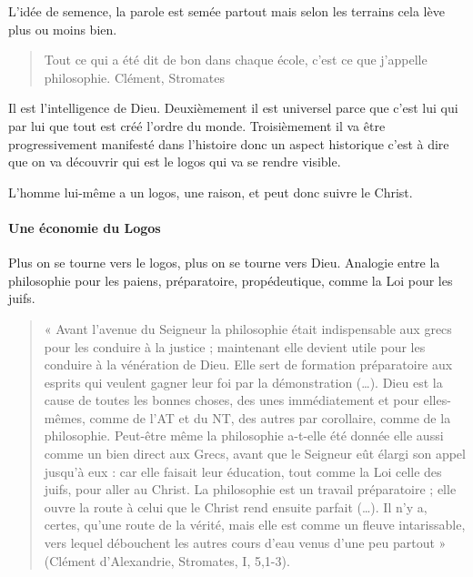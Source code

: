       
      L'idée de semence, la parole est semée partout mais selon les terrains cela lève plus ou moins bien.
      \begin{quote}
      Tout ce qui a été dit de bon dans chaque école, c'est ce que j'appelle philosophie. Clément, Stromates
          
      \end{quote}
      Il est l'intelligence de Dieu. Deuxièmement il est universel parce que c'est lui qui par lui que tout est créé l'ordre du monde. Troisièmement il va être progressivement manifesté dans l'histoire donc un aspect historique c'est à dire que on va découvrir qui est le logos qui va se rendre visible. 
 

L'homme lui-même a un logos, une raison, et peut donc suivre le Christ. 
  ~
  
       \paragraph{Une économie du Logos}
       Plus on se tourne vers le logos, plus on se tourne vers Dieu. Analogie entre la philosophie pour les paiens, préparatoire, propédeutique, comme la Loi pour les juifs. 
        \begin{quote}
      «  Avant  l’avenue  du  Seigneur  la  philosophie  était  indispensable  aux  grecs  pour  les  conduire  à la  justice  ;  maintenant  elle  devient  utile  pour  les  conduire  à  la  vénération  de  Dieu.  Elle  sert  de formation  préparatoire  aux  esprits  qui  veulent  gagner  leur  foi  par  la  démonstration  (…).  Dieu est  la  cause  de  toutes  les  bonnes  choses,  des  unes  immédiatement  et  pour  elles-mêmes, comme  de  l’AT  et  du  NT,  des  autres  par  corollaire,  comme  de  la  philosophie.  Peut-être  même la  philosophie  a-t-elle  été  donnée  elle  aussi  comme  un  bien  direct  aux  Grecs,  avant  que  le Seigneur  eût  élargi  son  appel  jusqu’à  eux  :  car  elle  faisait  leur  éducation,  tout  comme  la  Loi celle  des  juifs,  pour  aller  au  Christ.  La  philosophie  est  un  travail  préparatoire  ;  elle  ouvre  la route  à  celui  que  le  Christ  rend  ensuite  parfait  (…).  Il  n’y  a,  certes,  qu’une  route  de  la  vérité, mais  elle  est  comme  un  fleuve  intarissable,  vers  lequel  débouchent  les  autres  cours  d’eau venus  d’une  peu partout  »  (Clément  d’Alexandrie,  Stromates,  I, 5,1-3). 
  \end{quote}
  
